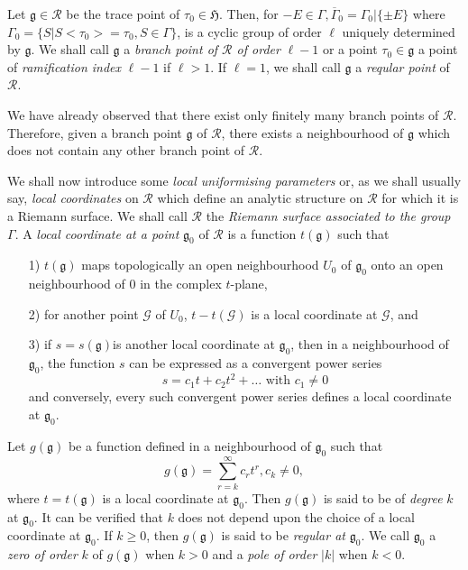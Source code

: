 \begin{defi*}
Let $\mathfrak{g} \in \mathscr{R}$ be the trace point of
$\tau_0 \in \mathfrak{H}$. Then, for $-E\in \Gamma,
\overline{\Gamma}_0= \Gamma_0|\{\pm E\}$ where $\Gamma_0 =
\{S|S<\tau_0> = \tau_0, S \in \Gamma\}$, is a cyclic group of
order $\ell$ uniquely determined by $\mathfrak{g}$. We shall call
$\mathfrak{g}$ a \textit{branch point of $\mathscr{R}$ of order} $\ell
- 1$ or a point $\tau_0 \in \mathfrak{g}$ a point of
\textit{ramification index} $\ell-1$ if $\ell>1$. If $\ell=1$, we
shall call $\mathfrak{g}$ a \textit{reqular point} of $\mathscr{R}$.
\end{defi*}

We have already observed that there exist only finitely many branch
points of $\mathscr{R}$. Therefore, given a branch point $\mathfrak{g}$
of $\mathscr{R}$, there exists a neighbourhood of $\mathfrak{g}$ which
does not contain any other branch point of $\mathscr{R}$.

We shall now introduce some \textit{local uniformising parameters} or,
as we shall usually say, \textit{local coordinates} on $\mathscr{R}$
which define an analytic structure on $\mathscr{R}$ for which it is a
Riemann surface. We shall call $\mathscr{R}$ the \textit{Riemann
surface associated to the group} $\Gamma$. A \textit{local
coordinate at a point} $\mathfrak{g}_0$ of $\mathscr{R}$ is a
function $t(\mathfrak{g})$ such that 
\begin{itemize}
\item[1)] $t(\mathfrak{g})$ maps topologically an open
  neighbourhood $U_0$ of $\mathfrak{g}_0$ onto an open neighbourhood of
  $0$ in the complex $t$-plane,

\item[2)] for another point $\mathcal{G}$ of $U_0$, $t-t(\mathcal{G})$
  is a local coordinate at $\mathcal{G}$, and 

\item[3)] if $s=s(\mathfrak{g})$\pageoriginale is another local
  coordinate at $\mathfrak{g}_0$, then in a neighbourhood of
  $\mathfrak{g}_0$, the function $s$ can be expressed as a convergent
  power series 
$$
s=c_1 t + c_2 t^2 + \ldots \text{ with } c_1 \neq 0
$$
and conversely, every such convergent power series defines a local
coordinate at $\mathfrak{g}_0$.
\end{itemize}

Let $g(\mathfrak{g})$ be a function defined in a neighbourhood of
$\mathfrak{g}_0$ such that 
$$
g(\mathfrak{g}) = \sum^{\infty}_{r=k} c_r t^r, c_k \neq 0,
$$
where $t=t(\mathfrak{g})$ is a local coordinate at
$\mathfrak{g}_0$. Then $g(\mathfrak{g})$ is said to be of
\textit{degree} $k$ at $\mathfrak{g}_0$. It can be verified that $k$
does not depend upon the choice of a local coordinate at
$\mathfrak{g}_0$. If $k \geq 0$, then $g(\mathfrak{g})$ is said to be
\textit{regular at} $\mathfrak{g}_0$. We call $\mathfrak{g}_0$ a
\textit{zero of order} $k$ of $g(\mathfrak{g})$ when $k>0$ and a
\textit{pole of order} $|k|$ when $k<0$.

